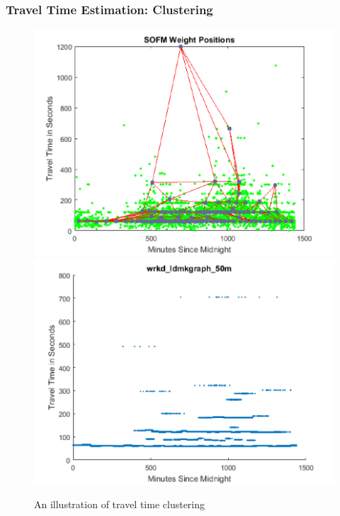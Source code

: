 \documentclass{beamer}
\theoremstyle{definition}
\begin{document}
\begin{frame}
\frametitle{Travel Time Estimation: Clustering}
\begin{figure}[h!]
\centering
\includegraphics[scale = 0.4]{trvltime_clus}
\includegraphics[scale = 0.4]{trvltime_neurons}
\caption{An illustration of travel time clustering} 
\end{figure}
\end{frame}
\end{document}
